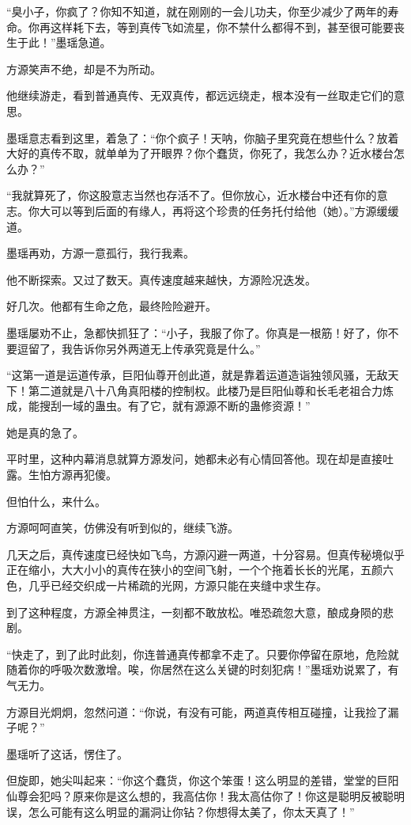 \begin{this_body}
“臭小子，你疯了？你知不知道，就在刚刚的一会儿功夫，你至少减少了两年的寿命。你再这样耗下去，等到真传飞如流星，你不禁什么都得不到，甚至很可能要丧生于此！”墨瑶急道。

方源笑声不绝，却是不为所动。

他继续游走，看到普通真传、无双真传，都远远绕走，根本没有一丝取走它们的意思。

墨瑶意志看到这里，着急了：“你个疯子！天呐，你脑子里究竟在想些什么？放着大好的真传不取，就单单为了开眼界？你个蠢货，你死了，我怎么办？近水楼台怎么办？”

“我就算死了，你这股意志当然也存活不了。但你放心，近水楼台中还有你的意志。你大可以等到后面的有缘人，再将这个珍贵的任务托付给他（她）。”方源缓缓道。

墨瑶再劝，方源一意孤行，我行我素。

他不断探索。又过了数天。真传速度越来越快，方源险况迭发。

好几次。他都有生命之危，最终险险避开。

墨瑶屡劝不止，急都快抓狂了：“小子，我服了你了。你真是一根筋！好了，你不要逗留了，我告诉你另外两道无上传承究竟是什么。”

“这第一道是运道传承，巨阳仙尊开创此道，就是靠着运道造诣独领风骚，无敌天下！第二道就是八十八角真阳楼的控制权。此楼乃是巨阳仙尊和长毛老祖合力炼成，能搜刮一域的蛊虫。有了它，就有源源不断的蛊修资源！”

她是真的急了。

平时里，这种内幕消息就算方源发问，她都未必有心情回答他。现在却是直接吐露。生怕方源再犯傻。

但怕什么，来什么。

方源呵呵直笑，仿佛没有听到似的，继续飞游。

几天之后，真传速度已经快如飞鸟，方源闪避一两道，十分容易。但真传秘境似乎正在缩小，大大小小的真传在狭小的空间飞射，一个个拖着长长的光尾，五颜六色，几乎已经交织成一片稀疏的光网，方源只能在夹缝中求生存。

到了这种程度，方源全神贯注，一刻都不敢放松。唯恐疏忽大意，酿成身陨的悲剧。

“快走了，到了此时此刻，你连普通真传都拿不走了。只要你停留在原地，危险就随着你的呼吸次数激增。唉，你居然在这么关键的时刻犯病！”墨瑶劝说累了，有气无力。

方源目光炯炯，忽然问道：“你说，有没有可能，两道真传相互碰撞，让我捡了漏子呢？”

墨瑶听了这话，愣住了。

但旋即，她尖叫起来：“你这个蠢货，你这个笨蛋！这么明显的差错，堂堂的巨阳仙尊会犯吗？原来你是这么想的，我高估你！我太高估你了！你这是聪明反被聪明误，怎么可能有这么明显的漏洞让你钻？你想得太美了，你太天真了！”


\end{this_body}
